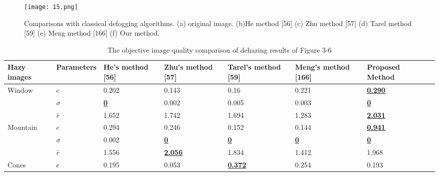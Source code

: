 \documentclass[doctor,english,listoffigures,listoftables]{thesis-uestc}
\begin{document}
\begin{figure}[H]
	\centering
	\texttt{[image: 15.png]}
	\caption{Comparisons with classical defogging algorithms. (a) original image. (b)He method [56] (c) Zhu method [57] (d) Tarel method [59] (e) Meng method [166] (f) Our method.
}
	\label{fig15}
\end{figure}

\begin{table*}[!htb]
	\centering
	\caption{The objective image quality comparison of dehazing results of Figure 3-6}
	
	\begin{tabular}{|p{56pt}|p{50pt}|p{53pt}|p{53pt}|p{53pt}|p{53pt}|p{53pt}|p{50pt}|}
		\hline
		Hazy images &Parameters& He's method [56] & Zhu's method [57] & Tarel's method [59] & Meng's method [166] &  \textbf{Proposed Method}\\
		\hline
		
		Window&$ e$&0.202&0.143&0.16&0.221&\textbf{\underline{	0.290  }} 
		
		 \\ 
		
		& $\sigma$&\textbf{\underline{0}}&0.002&0.005&0.003&\textbf{\textbf{\underline{0}}}  
		
		  \\    

		
		& $\bar r$&1.652&1.742&1.694&1.283&\textbf{\underline{2.031}}

		\\   

		
		\hline

		 \hline

		
		Mountain&$ e$&0.294&0.246&0.152&0.144&\textbf{\underline{0.941}}

		\\    

		&$\sigma$&0.002&\textbf{\underline{0}}&\textbf{\underline{0}}&\textbf{\underline{0}}&\textbf{\underline{0}}

		\\    	

		& $\bar r$&1.556&\textbf{\underline{2.056}}&1.834&1.412&1.968

		\\   
		 \hline

		 \hline
		 

		
		Cones&$ e$&0.195&0.053&\textbf{\underline{0.372}}&0.254&0.193

		\\    	


\end{tabular}
\end{table*}
\end{document}
